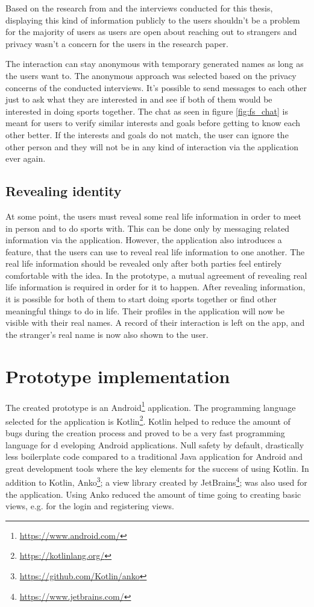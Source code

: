 Based on the  research from \cite{socialAdHoc} and the interviews conducted for this thesis, displaying this kind of information publicly to the users shouldn't be a problem for the majority of users as users are open about reaching out to strangers and privacy wasn't a concern for the users in the research paper.

The interaction can stay anonymous with temporary generated names as long as the users want to. The anonymous approach was selected based on the privacy concerns of the conducted interviews. It's possible to send messages to each other just to ask what they are interested in and see if both of them would be interested in doing sports together. The chat as seen in figure \ref{fig:fs_chat} is meant for users to verify similar interests and goals before getting to know each other better. If the interests and goals do not match, the user can ignore the other person and they will not be in any kind of interaction via the application ever again.

\subsection{Revealing identity}

At some point, the users must reveal some real life information in order to meet in person and to do sports with. This can be done only by messaging related information via the application. However, the application also introduces a feature, that the users can use to reveal real life information to one another. The real life information should be revealed only after both parties feel entirely comfortable with the idea. In the prototype, a mutual agreement of revealing real life information is required in order for it to happen. After revealing information, it is possible for both of them to start doing sports together or find other meaningful things to do in life. Their profiles in the application will now be visible with their real names. A record of their interaction is left on the app, and the stranger's real name is now also shown to the user.
\clearpage

\section{Prototype implementation}

The created prototype is an Android\footnote{\url{https://www.android.com/}} application. The programming language selected for the application is Kotlin\footnote{\url{https://kotlinlang.org/}}. Kotlin helped to reduce the amount of bugs during the creation process and proved to be a very fast programming language for d	eveloping Android applications. Null safety by default, drastically less boilerplate code compared to a traditional Java application for Android and great development tools where the key elements for the success of using Kotlin. In addition to Kotlin, Anko\footnote{\url{https://github.com/Kotlin/anko}}; a view library created by JetBrains\footnote{\url{https://www.jetbrains.com/}}; was also used for the application. Using Anko reduced the amount of time going to creating basic views, e.g. for the login and registering views.

